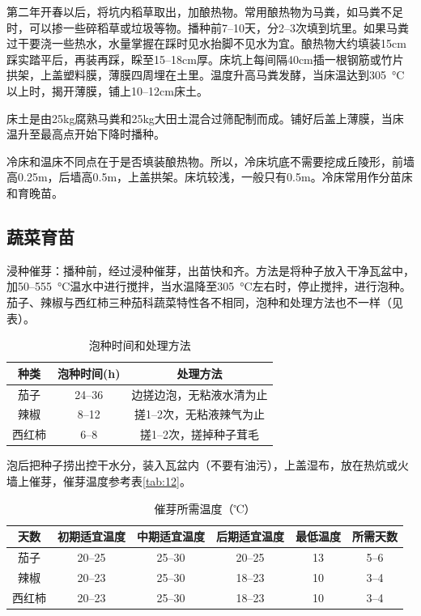 \documentclass{ctexbook}
\begin{document}
第二年开春以后，将坑内稻草取出，加酿热物。常用酿热物为马粪，如马粪不足时，可以掺一些碎稻草或垃圾等物。播种前7--10天，分2--3次填到坑里。如果马粪过干要浇一些热水，水量掌握在踩时见水抬脚不见水为宜。酿热物大约填装15cm踩实踏平后，再装再踩，睬至15--18cm厚。床坑上每间隔40cm插一根钢筋或竹片拱架，上盖塑料膜，薄膜四周埋在土里。温度升高马粪发酵，当床温达到30\SI{5}{\degreeCelsius}以上时，揭开薄膜，铺上10--12cm床土。

床土是由25kg腐熟马粪和25kg大田土混合过筛配制而成。铺好后盖上薄膜，当床温升至最高点开始下降时播种。

冷床和温床不同点在于是否填装酿热物。所以，冷床坑底不需要挖成丘陵形，前墙高0.25m，后墙高0.5m，上盖拱架。床坑较浅，一般只有0.5m。冷床常用作分苗床和育晚苗。
\subsection{蔬菜育苗}
浸种催芽：播种前，经过浸种催芽，出苗快和齐。方法是将种子放入干净瓦盆中，加50--55\SI{5}{\degreeCelsius}温水中进行搅拌，当水温降至30\SI{5}{\degreeCelsius}左右时，停止搅拌，进行泡种。茄子、辣椒与西红柿三种茄科蔬菜特性各不相同，泡种和处理方法也不一样（见表）。
\begin{table}[htbp]
  \centering
  \caption{泡种时间和处理方法}\label{tab:11}
  \begin{tabular}{c|c|c}
    \hline
    种类 & 泡种时间(h) & 处理方法 \\  \hline
    茄子 & 24--36 & 边搓边泡，无粘液水清为止 \\
    辣椒 & 8--12 & 搓1--2次，无粘液辣气为止 \\
    西红柿 & 6--8 & 搓1--2次，搓掉种子茸毛 \\
    \hline
  \end{tabular}
\end{table}

泡后把种子捞出控干水分，装入瓦盆内（不要有油污），上盖湿布，放在热炕或火墙上催芽，催芽温度参考表\ref{tab:12}。
\begin{table}[htbp]
	\centering
	\caption{催芽所需温度（℃）}
	\label{tab:12}
	\begin{tabular}{c|c|c|c|c|c}
		\hline
	天数	& 初期适宜温度   & 中期适宜温度   & 后期适宜温度   &    最低温度  & 所需天数 \\
		\hline
		茄子    & 20--25 & 25--30 & 20--25 & 13    & 5--6 \\
		辣椒    & 20--23 & 25--30 & 18--23 & 10    & 3--4 \\
		西红柿   & 20--23 & 25--30 & 18--23 & 10    & 3--4 \\
		\hline
	\end{tabular}%
	\label{tab:addlabel}%
\end{table}%
\end{document}
